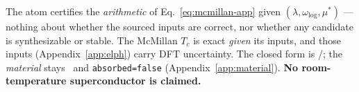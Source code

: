 The atom certifies the \emph{arithmetic} of Eq.~\eqref{eq:mcmillan-app}
given $(\lambda,\omega_{\log},\mu^{*})$ --- nothing about whether the
sourced inputs are correct, nor whether any candidate is synthesizable or
stable. The McMillan $T_c$ is exact \emph{given} its inputs, and those
inputs (Appendix~\ref{app:elph}) carry DFT uncertainty. The closed form is
\tierGreen/\tierBlue; the \emph{material} stays \tierOrange\ and
\texttt{absorbed=false} (Appendix~\ref{app:material}). \textbf{No
room-temperature superconductor is claimed.}
